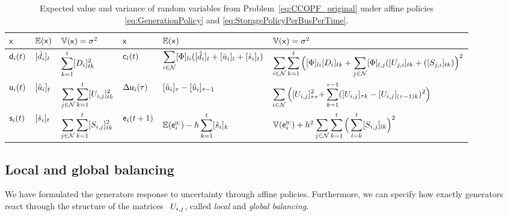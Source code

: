 \documentclass[final,3p,times,twocolumn]{elsarticle}  %
\begin{document}
\begin{table}
	\centering
	\caption{Expected value and variance of random variables from Problem~\eqref{eq:CCOPF_original} under affine policies \eqref{eq:GenerationPolicy} and \eqref{eq:StoragePolicyPerBusPerTime}.\label{tab:Moments}}
	\small
	\begin{tabular}{lll|lll}
		\toprule
		$\mathsf{x}$ & $\mathbb{E}(\mathsf{x})$ & $\mathbb{V}(\mathsf{x}) = \sigma^2$ & $\mathsf{x}$ & $\mathbb{E}(\mathsf{x})$ & $\mathbb{V}(\mathsf{x}) = \sigma^2$\\
		\midrule
		$\mathsf{d}_i(t)$ & $[\hat{d}_i]_t$ & $\displaystyle\sum_{k=1}^{t} [\Load_i]_{tk}^2$ & $\mathsf{c}_l(t)$ & $\displaystyle\sum_{i \in \mathcal{N}} [\Phi]_{li} ( [\hat{d}_i]_t + [ \hat{u}_i ]_t +[ \hat{s}_i ]_t )$ & $ \displaystyle\sum_{i \in \mathcal{\nbus}} \displaystyle \sum_{k=1}^{t} \Big(  [\ptdfmat]_{li} [\Load_i]_{tk} + \displaystyle \sum_{j \in \mathcal{\nbus}} [\ptdfmat]_{l,j} ([\Gen_{j,i}]_{tk} + ([\Storage_{j,i}]_{tk}) \Big)^2$\\
		$\mathsf{u}_i(t)$ & $[ \hat{u}_i ]_t$ & $\displaystyle\sum_{j \in \mathcal{\nbus}} \displaystyle\sum_{k=1}^{t} [ \Gen_{i,j} ]_{tk}^2$ & $\Delta\mathsf{u}_i(\tau)$ & $[ \hat{u}_i ]_{\tau} - [ \hat{u}_i ]_{\tau{-}1}$ &  $\displaystyle\sum_{i \in \mathcal{\nbus}} \Big( [\Gen_{i,j}]_{\tau \tau}^2 {+} \sum_{k=1}^{\tau{-}1} ( [\Gen_{i,j}]_{\tau k} - [\Gen_{i,j}]_{(\tau-1) k})^2 \Big) $\\
		$\mathsf{s}_i(t)$ & $[ \hat{s}_i ]_t$ & $\displaystyle\sum_{j \in \mathcal{\nbus}} \displaystyle\sum_{k=1}^{t} [ \Storage_{i,j} ]_{tk}^2$ & $\mathsf{e}_i(t+1)$ & $\mathbb{E}(\mathsf{e}_i^{\textsc{ic}}) - h \displaystyle \sum_{k=1}^{t} [ \hat{s}_i ]_k $	 & $\var{\rv\energy_i^{\textsc{ic}}} + h^2 \displaystyle \sum_{j \in \mathcal{\nbus}} \displaystyle \sum_{k=1}^{t} \Big(\displaystyle \sum_{l=k}^{t} [\Storage_{i,j}]_{lk} \Big)^2$ \\	
		\bottomrule
	\end{tabular}
\end{table}


\subsection{Local and global balancing}
\label{sec:localglobal}

We have formulated the generators response to uncertainty through affine policies. Furthermore, we can specify how exactly generators react through the structure of the matrices ~$\Gen_{i,j}$, called \emph{local} and \emph{global balancing}.
\end{document}
